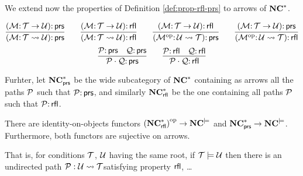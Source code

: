 We extend now the properties of Definition \ref{def:prop-rfl-prs} to arrows of $\mathbf{NC}^*$.

\begin{definition}
    $$\infer{(\cM \of \cT \leadsto \cU)\of \prs}{(\cM \of \cT \to \cU)\of \prs}\qquad \infer{(\cM \of \cT \leadsto \cU)\of \rfl}{(\cM \of \cT \to \cU)\of \rfl}\qquad \infer{(\op{\cM} \of \cU \leadsto \cT)\of \prs}{(\cM \of \cT \to \cU)\of \rfl}
    \qquad \infer{(\op{\cM} \of \cU \leadsto \cT)\of \rfl}{(\cM \of \cT \to \cU)\of \prs}$$
$$\infer{\cP\cdot\cQ\of \prs}{\cP\of \prs & \cQ \of \prs} \qquad \infer{\cP\cdot\cQ\of \rfl}{\cP\of \rfl & \cQ \of \rfl} $$

Furhter, let $\mathbf{NC}^*_{{\mathsf{prs}}}$ be the wide subcategory of $\mathbf{NC}^*$ containing as arrows all the paths ${\mathcal{P}}$ such that  ${\mathcal{P}} {:}\, {\mathsf{prs}}$, and similarly $\mathbf{NC}^*_{{\mathsf{rfl}}}$ be the one containing all paths ${\mathcal{P}}$ such that  ${\mathcal{P}} {:}\, {\mathsf{rfl}}$.

\end{definition}

\begin{theorem}
    There are identity-on-objects functors  ${(\mathbf{NC}^*_{{\mathsf{rfl}}})}^{\mathrm{op}} \rightarrow \mathbf{NC}^{\models}$ and $\mathbf{NC}^*_{{\mathsf{prs}}} \rightarrow \mathbf{NC}^{\models}$. Furthermore, both functors are sujective on arrows. 

    That is, for conditions ${\mathcal{T}}$, ${\mathcal{U}}$ having the same root, if ${\mathcal{T}} \models {\mathcal{U}}$ then there is an undirected path ${\mathcal{P}}:{\mathcal{U}} \leadsto {\mathcal{T}} $satisfying property ${\mathsf{rfl}}$, \dots
\end{theorem}



